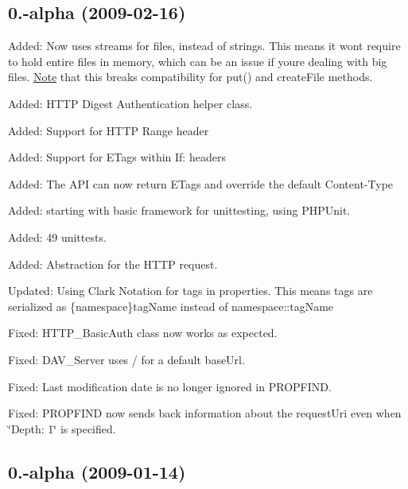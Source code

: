 \subsection*{0.-\/alpha (2009-\/02-\/16) }


\begin{DoxyItemize}
\item Added\+: Now uses streams for files, instead of strings. This means it won\textquotesingle{}t require to hold entire files in memory, which can be an issue if you\textquotesingle{}re dealing with big files. \mbox{\hyperlink{class_note}{Note}} that this breaks compatibility for put() and create\+File methods.
\item Added\+: H\+T\+TP Digest Authentication helper class.
\item Added\+: Support for H\+T\+TP Range header
\item Added\+: Support for E\+Tags within If\+: headers
\item Added\+: The A\+PI can now return E\+Tags and override the default Content-\/\+Type
\item Added\+: starting with basic framework for unittesting, using P\+H\+P\+Unit.
\item Added\+: 49 unittests.
\item Added\+: Abstraction for the H\+T\+TP request.
\item Updated\+: Using Clark Notation for tags in properties. This means tags are serialized as \{namespace\}tag\+Name instead of namespace\+::tag\+Name
\item Fixed\+: H\+T\+T\+P\+\_\+\+Basic\+Auth class now works as expected.
\item Fixed\+: D\+A\+V\+\_\+\+Server uses / for a default base\+Url.
\item Fixed\+: Last modification date is no longer ignored in P\+R\+O\+P\+F\+I\+ND.
\item Fixed\+: P\+R\+O\+P\+F\+I\+ND now sends back information about the request\+Uri even when \char`\"{}\+Depth\+: 1\char`\"{} is specified.
\end{DoxyItemize}

\subsection*{0.-\/alpha (2009-\/01-\/14) }


